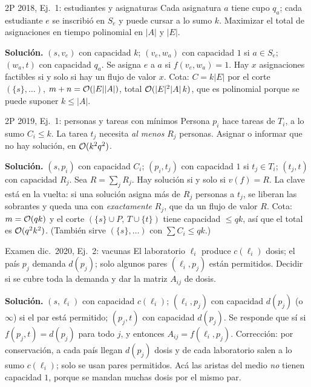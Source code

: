 \begin{problema}{2P 2018, Ej.~1: estudiantes y asignaturas}
Cada asignatura $a$ tiene cupo $q_a$; cada estudiante $e$ se inscribió en $S_e$ y puede cursar a lo sumo $k$. Maximizar el total de asignaciones en tiempo polinomial en $|A|$ y $|E|$.

\smallskip
\textbf{Solución.} $(s,v_e)$ con capacidad $k$; $(v_e,w_a)$ con capacidad $1$ si $a\in S_e$; $(w_a,t)$ con capacidad $q_a$. Se asigna $e$ a $a$ si $f(v_e,w_a)=1$. Hay $x$ asignaciones factibles si y solo si hay un flujo de valor $x$. Cota: $C=k|E|$ por el corte $(\{s\},\dots)$, $m+n=\mathcal{O}(|E||A|)$, total $\mathcal{O}(|E|^2|A|\,k)$, que es polinomial porque se puede suponer $k\le|A|$.
\end{problema}

\begin{problema}{2P 2019, Ej.~1: personas y tareas con mínimos}
Persona $p_i$ hace tareas de $T_i$, a lo sumo $C_i\le k$. La tarea $t_j$ necesita \emph{al menos} $R_j$ personas. Asignar o informar que no hay solución, en $\mathcal{O}(k^2q^2)$.

\smallskip
\textbf{Solución.} $(s,p_i)$ con capacidad $C_i$; $(p_i,t_j)$ con capacidad $1$ si $t_j\in T_i$; $(t_j,t)$ con capacidad $R_j$. Sea $R=\sum_j R_j$. Hay solución si y solo si $v(f)=R$. La clave está en la vuelta: si una solución asigna más de $R_j$ personas a $t_j$, se liberan las sobrantes y queda una con \emph{exactamente} $R_j$, que da un flujo de valor $R$. Cota: $m=\mathcal{O}(qk)$ y el corte $(\{s\}\cup P,\,T\cup\{t\})$ tiene capacidad $\le qk$, así que el total es $\mathcal{O}(q^2k^2)$. (También sirve $(\{s\},\dots)$ con $\sum C_i\le qk$.)
\end{problema}

\begin{problema}{Examen dic.~2020, Ej.~2: vacunas}
El laboratorio $\ell_i$ produce $c(\ell_i)$ dosis; el país $p_j$ demanda $d(p_j)$; solo algunos pares $(\ell_i,p_j)$ están permitidos. Decidir si se cubre toda la demanda y dar la matriz $A_{ij}$ de dosis.

\smallskip
\textbf{Solución.} $(s,\ell_i)$ con capacidad $c(\ell_i)$; $(\ell_i,p_j)$ con capacidad $d(p_j)$ (o $\infty$) si el par está permitido; $(p_j,t)$ con capacidad $d(p_j)$. Se responde que sí si $f(p_j,t)=d(p_j)$ para todo $j$, y entonces $A_{ij}=f(\ell_i,p_j)$. Corrección: por conservación, a cada país llegan $d(p_j)$ dosis y de cada laboratorio salen a lo sumo $c(\ell_i)$; solo se usan pares permitidos. Acá las aristas del medio \emph{no} tienen capacidad $1$, porque se mandan muchas dosis por el mismo par.
\end{problema}

